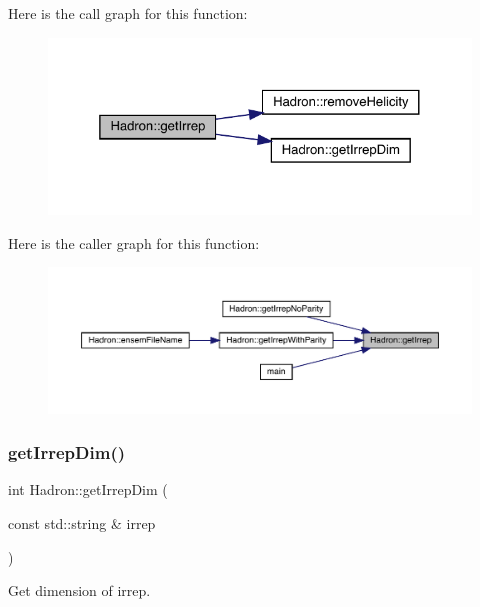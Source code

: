 Here is the call graph for this function\+:
\nopagebreak
\begin{figure}[H]
\begin{center}
\leavevmode
\includegraphics[width=325pt]{d1/daf/namespaceHadron_a33d1d1e15a13f881d974049a8ae1c3dc_cgraph}
\end{center}
\end{figure}
Here is the caller graph for this function\+:
\nopagebreak
\begin{figure}[H]
\begin{center}
\leavevmode
\includegraphics[width=350pt]{d1/daf/namespaceHadron_a33d1d1e15a13f881d974049a8ae1c3dc_icgraph}
\end{center}
\end{figure}
\mbox{\label{namespaceHadron_a0451202d2f27c90c438c0d23da609c62}} 
\subsubsection{\texorpdfstring{getIrrepDim()}{getIrrepDim()}}
{\footnotesize\ttfamily int Hadron\+::get\+Irrep\+Dim (\begin{DoxyParamCaption}\item[{const std\+::string \&}]{irrep }\end{DoxyParamCaption})}



Get dimension of irrep. 

